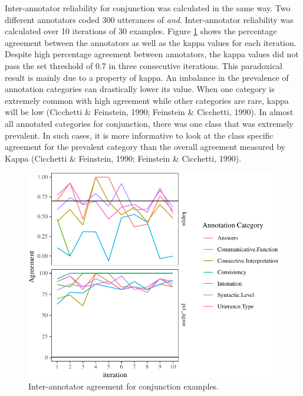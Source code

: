 \documentclass[floatsintext,man]{apa6}
\theoremstyle{definition}
\theoremstyle{definition}
\theoremstyle{definition}
\theoremstyle{remark}
\begin{document}
Inter-annotator reliability for conjunction was calculated in the same
way. Two different annotators coded 300 utterances of \emph{and}.
Inter-annotator reliability was calculated over 10 iterations of 30
examples. Figure \ref{fig:andReliabilityPlot} shows the percentage
agreement between the annotators as well as the kappa values for each
iteration. Despite high percentage agreement between annotators, the
kappa values did not pass the set threshold of 0.7 in three consecutive
iterations. This paradoxical result is mainly due to a property of
kappa. An imbalance in the prevalence of annotation categories can
drastically lower its value. When one category is extremely common with
high agreement while other categories are rare, kappa will be low
(Cicchetti \& Feinstein, 1990; Feinstein \& Cicchetti, 1990). In almost
all annotated categories for conjunction, there was one class that was
extremely prevalent. In such cases, it is more informative to look at
the class specific agreement for the prevalent category than the overall
agreement measured by Kappa (Cicchetti \& Feinstein, 1990; Feinstein \&
Cicchetti, 1990).

\begin{figure}[tb]

{\centering \includegraphics{figs/andReliabilityPlot-1} 

}

\caption{Inter-annotator agreement for conjunction examples.}\label{fig:andReliabilityPlot}
\end{figure}
\end{document}
